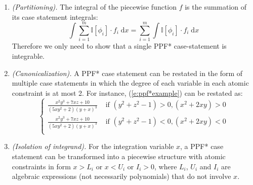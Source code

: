 \documentclass[letterpaper]{article}
\newcommand{\indicator}{\mathbb{I}}%
\newcommand{\case}[2]{#2 &\text{ if } #1}%
\newcommand{\otherwise}[1]{#1 &\text{ otherwise}}
\newcommand{\dd}{\;\mathrm{d}} %
\begin{document}
\begin{enumerate}[leftmargin=2.6ex]
\item \emph{(Partitioning).}
The integral of the piecewise function $f$ is the summation of its case statement integrals:
{\footnotesize
\begin{equation*}
\int \sum_{i=1}^m \indicator[\phi_i]\cdot f_i \dd x = 
\sum_{i=1}^m \int \indicator[\phi_i] \cdot f_i \dd x
\end{equation*}
}
Therefore we only need to show that a single PPF* case-statement is integrable.

\item \emph{(Canonicalization).} A PPF* case statement can be restated in the form of multiple case statements in which 
the degree of each variable in each atomic constraint is at most 2.
For instance, (\ref{e:ppf*example}) can be restated as:
\begin{equation}
\begin{cases}
\case{(y^2\!+\!z^2\!-\!1)>0, (x^2+2xy)>0}{\frac{x^2 y^3 + 7xz + 10}{(5xy^2 + 2)(y + x)^3}}\\
\case{(y^2\!+\!z^2\!-\!1)<0, (x^2+2xy)<0}{\frac{x^2 y^3 + 7xz + 10}{(5xy^2 + 2)(y + x)^3}}\\
\end{cases}
\end{equation}

\item \emph{(Isolation of integrand).} For the integration variable $x$, 
a PPF* case statement can be transformed into a piecewise structure 
with atomic constraints in form $x>L_i$ or $x<U_i$ or $I_i>0$, 
where $L_i$, $U_i$ and $I_i$ are 
algebraic expressions (not necessarily polynomials) that do not involve $x$. 


\end{enumerate}
\end{document}
